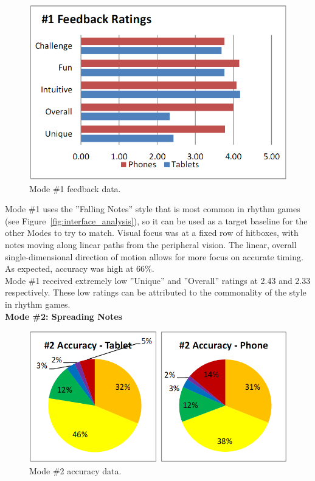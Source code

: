 \documentclass{sig-alternate}
\begin{document}
\begin{figure}[htb!]
	\begin{center}
		\includegraphics[width=1\linewidth]{figure_chart_rating_1}
	\end{center}
	\vspace{-12pt}
	\caption{Mode \#1 feedback data.}
	\label{fig:chart_rating_1}
\end{figure}

Mode \#1 uses the ''Falling Notes'' style that is most common in rhythm games (see Figure~\ref{fig:interface_analysis}), so it can be used as a target baseline for the other Modes to try to match. Visual focus was at a fixed row of hitboxes, with notes moving along linear paths from the peripheral vision. The linear, overall single-dimensional direction of motion allows for more focus on accurate timing. As expected, accuracy was high at 66\%. \\

Mode \#1 received extremely low ''Unique'' and ''Overall'' ratings at 2.43 and 2.33 respectively. These low ratings can be attributed to the commonality of the style in rhythm games. \\

\newpage
\noindent \textbf{Mode \#2: Spreading Notes}

\begin{figure}[htb!]
	\begin{center}
		\includegraphics[width=1\linewidth]{figure_chart_accuracy_2}
	\end{center}
	\vspace{-12pt}
	\caption{Mode \#2 accuracy data.}
	\label{fig:chart_accuracy_2}
\end{figure}
\end{document}
